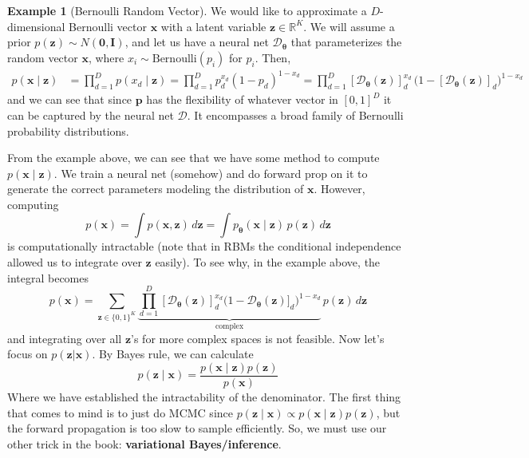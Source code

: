 \documentclass{article}
\theoremstyle{definition}
\newtheorem{example}{Example}[section]
\theoremstyle{remark}
\theoremstyle{definition}
\begin{document}
    \begin{example}[Bernoulli Random Vector] 
        We would like to approximate a $D$-dimensional Bernoulli vector $\mathbf{x}$ with a latent variable $\mathbf{z} \in \mathbb{R}^K$. We will assume a prior $p(\mathbf{z}) \sim N(\mathbf{0}, \mathbf{I})$, and let us have a neural net $\mathcal{D}_{\boldsymbol{\theta}}$ that parameterizes the random vector $\mathbf{x}$, where $x_i \sim \mathrm{Bernoulli}(p_i)$ for $p_i$. Then,
    \begin{align*}
        p(\mathbf{x} \mid \mathbf{z}) & = \prod_{d=1}^D p(x_d \mid \mathbf{z}) = \prod_{d=1}^D p_d^{x_d} (1 - p_d)^{1 - x_d} = \prod_{d=1}^D [\mathcal{D}_{\boldsymbol{\theta}} (\mathbf{z})]_d^{x_d} \, \big( 1 - [\mathcal{D}_{\boldsymbol{\theta}} (\mathbf{z})]_d\big)^{1 - x_d}
    \end{align*} 
    and we can see that since $\mathbf{p}$ has the flexibility of whatever vector in $[0, 1]^D$ it can be captured by the neural net $\mathcal{D}$. It encompasses a broad family of Bernoulli probability distributions. 
    \end{example}

    From the example above, we can see that we have some method to compute $p(\mathbf{x} \mid \mathbf{z})$. We train a neural net (somehow) and do forward prop on it to generate the correct parameters modeling the distribution of $\mathbf{x}$. However, computing 
    \[p(\mathbf{x}) = \int p(\mathbf{x}, \mathbf{z}) \,d\mathbf{z} = \int p_{\boldsymbol{\theta}} (\mathbf{x} \mid \mathbf{z}) \, p(\mathbf{z}) \,d\mathbf{z} \]
    is computationally intractable (note that in RBMs the conditional independence allowed us to integrate over $\mathbf{z}$ easily). To see why, in the example above, the integral becomes
    \[p(\mathbf{x}) = \sum_{\mathbf{z} \in \{0, 1\}^K} \underbrace{\prod_{d=1}^D [\mathcal{D}_{\boldsymbol{\theta}} (\mathbf{z})]_d^{x_d} \big( 1 - \mathcal{D}_{\boldsymbol{\theta}} (\mathbf{z})]_d \big)^{1 - x_d}}_{\text{complex}} \, p(\mathbf{z}) \, d\mathbf{z}\]
    and integrating over all $\mathbf{z}$'s for more complex spaces is not feasible. Now let's focus on $p(\mathbf{z} | \mathbf{x})$. By Bayes rule, we can calculate 
    \[p(\mathbf{z} \mid \mathbf{x}) = \frac{p(\mathbf{x} \mid \mathbf{z}) p(\mathbf{z})}{p(\mathbf{x})}\]
    Where we have established the intractability of the denominator. The first thing that comes to mind is to just do MCMC since $p(\mathbf{z} \mid \mathbf{x}) \propto p(\mathbf{x} \mid \mathbf{z}) p(\mathbf{z})$, but the forward propagation is too slow to sample efficiently. So, we must use our other trick in the book: \textbf{variational Bayes/inference}. 
\end{document}
